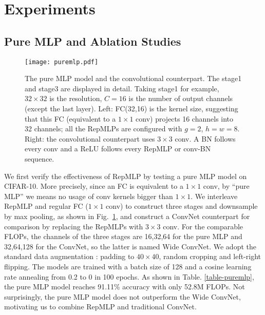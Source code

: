 \documentclass[10pt,twocolumn,letterpaper]{article}
\begin{document}
\section{Experiments}

\subsection{Pure MLP and Ablation Studies}
\begin{figure}
	\begin{center}
		\texttt{[image: puremlp.pdf]}
		\vspace{-0.25in}
		\caption{The pure MLP model and the convolutional counterpart. The stage1 and stage3 are displayed in detail. Taking stage1 for example, $32\times32$ is the resolution, $C=16$ is the number of output channels (except the last layer). Left: FC(32,16) is the kernel size, suggesting that this FC (equivalent to a $1\times1$ conv) projects 16 channels into 32 channels; all the RepMLPs are configured with $g=2$, $h=w=8$. Right: the convolutional counterpart uses $3\times3$ conv. A BN follows every conv and a ReLU follows every RepMLP or conv-BN sequence.}
		\label{fig-puremlp}
		\vspace{-0.25in}
	\end{center}
\end{figure}

We first verify the effectiveness of RepMLP by testing a pure MLP model on CIFAR-10. More precisely, since an FC is equivalent to a $1\times1$ conv, by ``pure MLP'' we means no usage of conv kernels bigger than $1\times1$. We interleave RepMLP and regular FC ($1\times1$ conv) to construct three stages and downsample by max pooling, as shown in Fig.~\ref{fig-puremlp}, and construct a ConvNet counterpart for comparison by replacing the RepMLPs with $3\times3$ conv. For the comparable FLOPs, the channels of the three stages are 16,32,64 for the pure MLP and 32,64,128 for the ConvNet, so the latter is named Wide ConvNet. We adopt the standard data augmentation \cite{he2016deep}: padding to $40\times40$, random cropping and left-right flipping. The models are trained with a batch size of 128 and a cosine learning rate annealing from 0.2 to 0 in 100 epochs. As shown in Table. \ref{table-puremlp}, the pure MLP model reaches 91.11\% accuracy with only 52.8M FLOPs. Not surprisingly, the pure MLP model does not outperform the Wide ConvNet, motivating us to combine RepMLP and traditional ConvNet. 
\end{document}
